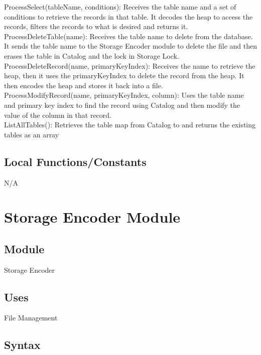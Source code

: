 \documentclass[12pt]{article}
\begin{document}
\noindent ProcessSelect(tableName, conditions): Receives the table name and a set of conditions to retrieve the records in that table. It decodes the heap to access the records, filters the records to what is desired and returns it. \\

\noindent ProcessDeleteTable(name): Receives the table name to delete from the database. It sends the table name to the Storage Encoder module to delete the file and then erases the table in Catalog and the lock in Storage Lock. \\

\noindent ProcessDeleteRecord(name, primaryKeyIndex): Receives the name to retrieve the heap, then it uses the primaryKeyIndex to delete the record from the heap. It then encodes the heap and stores it back into a file. \\ 

\noindent ProcessModifyRecord(name, primaryKeyIndex, column): Uses the table name and primary key index to find the record using Catalog and then modify the value of the column in that record. \\

\noindent ListAllTables(): Retrieves the table map from Catalog to and returns the existing tables as an array \\


\subsection{Local Functions/Constants}
N/A

\newpage

\section {Storage Encoder Module}

\subsection{Module}
Storage Encoder

\subsection {Uses}
File Management

\subsection {Syntax}
\end{document}

